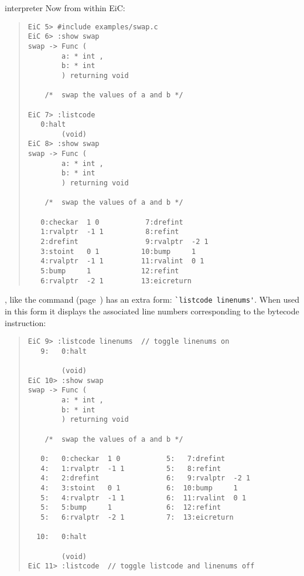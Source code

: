 \begin{Ventry} {interpreter}
Now from within EiC:
\begin{quote}
\begin{verbatim}
EiC 5> #include examples/swap.c
EiC 6> :show swap
swap -> Func (
        a: * int ,
        b: * int 
        ) returning void 

    /*  swap the values of a and b */

EiC 7> :listcode
   0:halt                
        (void)
EiC 8> :show swap
swap -> Func (
        a: * int ,
        b: * int 
        ) returning void 

    /*  swap the values of a and b */

   0:checkar  1 0           7:drefint             
   1:rvalptr  -1 1          8:refint              
   2:drefint                9:rvalptr  -2 1       
   3:stoint   0 1          10:bump     1          
   4:rvalptr  -1 1         11:rvalint  0 1        
   5:bump     1            12:refint              
   6:rvalptr  -2 1         13:eicreturn           
\end{verbatim}
\end{quote}

, like the  command (page~\pageref{item:trace}) has
an extra form: \verb+`listcode linenums'+. When used in this form it
displays the associated line numbers corresponding to the
bytecode instruction:

\begin{quote}
\begin{verbatim}
EiC 9> :listcode linenums  // toggle linenums on 
   9:   0:halt                

        (void)
EiC 10> :show swap
swap -> Func (
        a: * int ,
        b: * int 
        ) returning void 

    /*  swap the values of a and b */

   0:   0:checkar  1 0           5:   7:drefint             
   4:   1:rvalptr  -1 1          5:   8:refint              
   4:   2:drefint                6:   9:rvalptr  -2 1       
   4:   3:stoint   0 1           6:  10:bump     1          
   5:   4:rvalptr  -1 1          6:  11:rvalint  0 1        
   5:   5:bump     1             6:  12:refint              
   5:   6:rvalptr  -2 1          7:  13:eicreturn           

  10:   0:halt                

        (void)
EiC 11> :listcode  // toggle listcode and linenums off
\end{verbatim}
\end{quote}


\end{Ventry}
